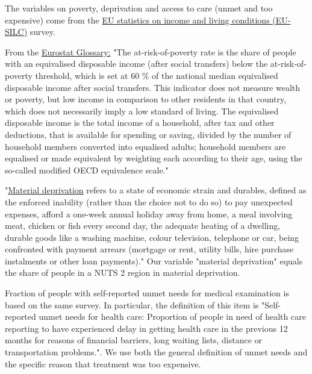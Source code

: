 \documentclass[a4paper,12pt]{article}
\begin{document}
The variables on poverty, deprivation and access to care (unmet and too expensive) come from the \href{https://ec.europa.eu/eurostat/statistics-explained/index.php?title=EU\_statistics\_on\_income\_and\_living\_conditions\_(EU-SILC)\_methodology}{EU statistics on income and living conditions (EU-SILC)} survey.

From the \href{https://ec.europa.eu/eurostat/statistics-explained/index.php?title=Glossary:At-risk-of-poverty\_rate}{Eurostat Glossary:} "The at-risk-of-poverty rate is the share of people with an equivalised disposable income (after social transfers) below the at-risk-of-poverty threshold, which is set at 60 \% of the national median equivalised disposable income after social transfers. This indicator does not measure wealth or poverty, but low income in comparison to other residents in that country, which does not necessarily imply a low standard of living. The equivalised disposable income is the total income of a household, after tax and other deductions, that is available for spending or saving, divided by the number of household members converted into equalised adults; household members are equalised or made equivalent by weighting each according to their age, using the so-called modified OECD equivalence scale."

"\href{https://ec.europa.eu/eurostat/statistics-explained/index.php?title=Glossary:Material\_deprivation}{Material deprivation} refers to a state of economic strain and durables, defined as the enforced inability (rather than the choice not to do so) to pay unexpected expenses, afford a one-week annual holiday away from home, a meal involving meat, chicken or fish every second day, the adequate heating of a dwelling, durable goods like a washing machine, colour television, telephone or car, being confronted with payment arrears (mortgage or rent, utility bills, hire purchase instalments or other loan payments)." Our variable "material deprivation" equals the share of people in a NUTS 2 region in material deprivation.

Fraction of people with self-reported unmet needs for medical examination is based on the same survey. In particular, the definition of this item is "Self-reported unmet needs for health care: Proportion of people in need of health care reporting to have experienced delay in getting health care in the previous 12 months for reasons of financial barriers, long waiting lists, distance or transportation problems.". We use both the general definition of unmet needs and the specific reason that treatment was too expensive.
\end{document}
